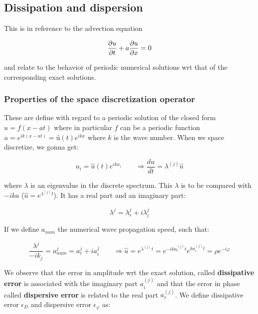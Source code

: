 \subsection{Dissipation and dispersion}
This is in reference to the advection equation 

\begin{equation}
\frac{\partial u}{\partial t} + a \frac{\partial u}{\partial x } = 0
\end{equation}

and relate to the behavior of periodic numerical solutions wrt that of the corresponding exact solutions. 

\subsubsection{Properties of the space discretization operator}
These are define with regard to a periodic solution of the closed form $u = f(x-at)$ where in particular $f$ can be a periodic function $u = e^{ik(x-at)} = û(t) e^{ikx}$ where $k$ is the wave number. When we space discretize, we gonna get: 

\begin{equation}
u _ i = \hat{u} (t) e^{ikx_i}\qquad \Rightarrow \frac{d u}{dt} = \lambda ^{(j)} \hat{u}
\end{equation}

where $\lambda$ is an eigenvalue in the discrete spectrum. This $\lambda$ is to be compared with $- i ka $ ($\hat{u} = e^{\lambda^{(j)}t}$). It has a real part and an imaginary part: 

\begin{equation}
\lambda ^{j} = \lambda _r ^{j}+ i\lambda _i^{j}
\end{equation}

If we define $a _{num}$ the numerical wave propagation speed, such that: 

\begin{equation}
\frac{\lambda ^{j}}{-ik_j} = a _{num} ^{j} = a_r ^{j} +  ia_i^{j} \qquad \Rightarrow \hat{u} = e^{\lambda ^{(j)} t} = e^{-ika_r^{(j)}t}e^{ka_i^{(j)}t} = \rho e^{-i\varphi}
\end{equation}

We observe that the error in amplitude wrt the exact solution, called \textbf{dissipative error} is associated with the imaginary part $a_i^{(j)}$ and that the error in phase called \textbf{dispersive error} is related to the real part $a_r^{(j)}$. We define dissipative error $\epsilon_D$ and dispersive error $\epsilon_\varphi$ as: 

